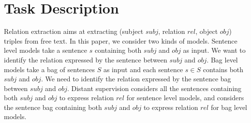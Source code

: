 \documentclass[11pt,a4paper]{article}
\begin{document}

\section{Task Description}
Relation extraction aims at extracting (subject $subj$, relation $rel$, object $obj$) triples from free text. In this paper, we consider two kinds of models. Sentence level models take a sentence $s$ containing both $subj$ and $obj$ as input. We want to identify the relation expressed by the sentence between $subj$ and $obj$. Bag level models take a bag of sentences $S$ as input and each sentence $s\in S$ contains both $subj$ and $obj$. We need to identify the relation expressed by the sentence bag between $subj$ and $obj$. Distant supervision considers all the sentences containing both $subj$ and $obj$ to express relation $rel$ for sentence level models, and considers the sentence bag containing both $subj$ and $obj$ to express relation $rel$ for bag level models.
\end{document}
